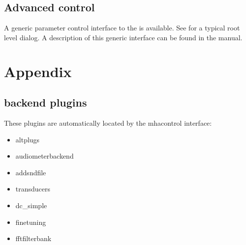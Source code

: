 \documentclass[11pt,a4paper,twoside]{article}
\newcommand{\+}{\discretionary{\mbox{\scriptsize$\hookleftarrow$}}{}{}}
\begin{document}

\subsection{Advanced control}\label{sec:advanced}

A generic parameter control interface to the \mha{} is available. See
 for a typical root level dialog.
%
A description of this generic interface can be found in the \mha{}
manual.


\section{Appendix}

\subsection{\mha{} backend plugins}

These plugins are automatically located by the mhacontrol interface:
%
\begin{itemize}
\item altplugs
\item audiometerbackend
\item addsndfile
\item transducers
\item dc\_simple
\item finetuning
\item fftfilterbank
\end{itemize}



\printindex
\end{document}

